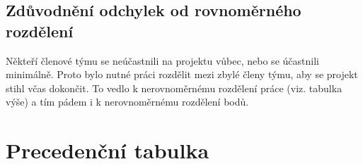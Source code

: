 \documentclass[a4paper, 11pt]{article}
\begin{document}
	\subsection{Zdůvodnění odchylek od rovnoměrného rozdělení}
	Někteří členové týmu se neúčastnili na projektu vůbec, nebo se účastnili minimálně. Proto bylo nutné práci rozdělit mezi zbylé členy týmu, aby se projekt stihl včas dokončit. 
	To vedlo k nerovnoměrnému rozdělení práce (viz. tabulka výše) a tím pádem i k nerovnoměrnému rozdělení bodů.
	




	\newpage
	\section*{Precedenční tabulka}
\end{document}
